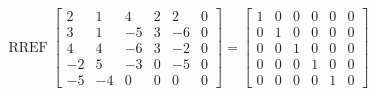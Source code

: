 \begin{exerciseAnswer} 


\[\operatorname{RREF} \left[\begin{array}{ccccc|c}
2 & 1 & 4 & 2 & 2 & 0 \\
3 & 1 & -5 & 3 & -6 & 0 \\
4 & 4 & -6 & 3 & -2 & 0 \\
-2 & 5 & -3 & 0 & -5 & 0 \\
-5 & -4 & 0 & 0 & 0 & 0
\end{array}\right] = \left[\begin{array}{ccccc|c}
1 & 0 & 0 & 0 & 0 & 0 \\
0 & 1 & 0 & 0 & 0 & 0 \\
0 & 0 & 1 & 0 & 0 & 0 \\
0 & 0 & 0 & 1 & 0 & 0 \\
0 & 0 & 0 & 0 & 1 & 0
\end{array}\right] \]



\end{exerciseAnswer}
